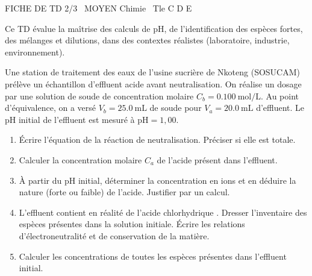\documentclass[11pt]{article}
\begin{document}
\begin{tcolorbox}[enhanced,colback=popink,colframe=popink,arc=10pt,boxrule=0pt,left=12pt,right=12pt,top=9pt,bottom=9pt]
{\color{white}\popxbold\small FICHE DE TD 2/3 \textbullet\ MOYEN \hfill Chimie \textbullet\ Tle C D E\par}
\end{tcolorbox}
\vspace{4pt}
Ce TD évalue la maîtrise des calculs de pH, de l'identification des espèces fortes, des mélanges et dilutions, dans des contextes réalistes (laboratoire, industrie, environnement).

\begin{exercice}
Une station de traitement des eaux de l'usine sucrière de Nkoteng (SOSUCAM) prélève un échantillon d'effluent acide avant neutralisation. On réalise un dosage par une solution de soude  de concentration molaire $C_b = \SI{0,100}{\mol\per\liter}$. 
Au point d'équivalence, on a versé $V_b = \SI{25,0}{\milli\liter}$ de soude pour $V_a = \SI{20,0}{\milli\liter}$ d'effluent. Le pH initial de l'effluent est mesuré à $\text{pH} = 1,00$.
\begin{enumerate}
    \item Écrire l'équation de la réaction de neutralisation. Préciser si elle est totale.
    \item Calculer la concentration molaire $C_a$ de l'acide présent dans l'effluent.
    \item À partir du pH initial, déterminer la concentration en ions  et en déduire la nature (forte ou faible) de l'acide. Justifier par un calcul.
    \item L'effluent contient en réalité de l'acide chlorhydrique . Dresser l'inventaire des espèces présentes dans la solution initiale. Écrire les relations d'électroneutralité et de conservation de la matière.
    \item Calculer les concentrations de toutes les espèces présentes dans l'effluent initial.
\end{enumerate}
\end{exercice}
\end{document}
